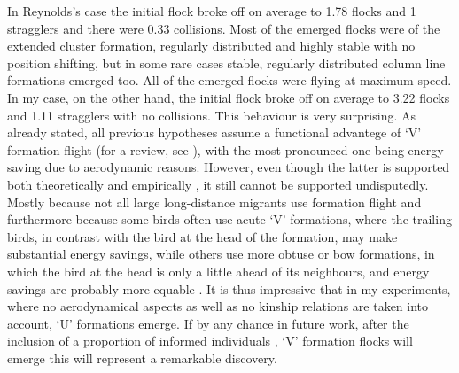 In Reynolds's case the initial flock broke off on average to 1.78 flocks and 1 stragglers and there were 0.33 collisions. Most of the emerged flocks were of the extended cluster formation, regularly distributed and highly stable with no position shifting, but in some rare cases stable, regularly distributed column line formations emerged too. All of the emerged flocks were flying at maximum speed. In my case, on the other hand, the initial flock broke off on average to 3.22 flocks and 1.11 stragglers with no collisions.  This behaviour is very surprising. As already stated, all previous hypotheses assume a functional advantege of `V' formation flight (for a review, see \cite{heppner:1997,speakman:1998}), with the most pronounced one being energy saving due to aerodynamic reasons. However, even though the latter is supported both theoretically and empirically \cite{badgerow:1981,badgerow:1988,hainsworth:1987,hainsworth:1989,lissaman:1970,speakman:1998}, it still cannot be supported undisputedly. Mostly because not all large long-distance migrants use formation flight and furthermore because some birds often use acute `V' formations, where the trailing birds, in contrast with the bird at the head of the formation, may make substantial energy savings, while others use more obtuse or bow formations, in which the bird at the head is only a little ahead of its neighbours, and energy savings are probably more equable \cite{andersson:2004}. It is thus impressive that in my experiments, where no aerodynamical aspects as well as no kinship relations \cite{andersson:2004} are taken into account, `U' formations emerge. If by any chance in future work, after the inclusion of a proportion of informed individuals \cite{couzin:2005}, `V' formation flocks will emerge this will represent a remarkable discovery.


